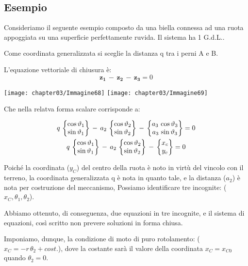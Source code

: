 		\subsection{Esempio}
		
		\begin{minipage}{.6\textwidth}
		Consideriamo il seguente esempio composto da una biella connessa ad una ruota appoggiata su una superficie perfettamente ruvida. Il sistema ha 1 G.d.L..
		
		Come coordinata generalizzata si sceglie la distanza q tra i perni A e B.\newline
		
			L'equazione vettoriale di chiusura è:
		\[\mathbf{z_1}\,-\,\mathbf{z_2}\,-\,\mathbf{z_3}=0\]
		
		\end{minipage}
	\hfill
\begin{minipage}{.4\textwidth}
\centering
		\texttt{[image: chapter03/Immagine68]}
		\texttt{[image: chapter03/Immagine69]}
		\end{minipage}
		
		
	
		
		Che nella relatva forma scalare corrisponde a:
		
		\begin{gather*}
		q\,\begin{Bmatrix}\cos{\vartheta_1}\\\sin{\vartheta_1}\end{Bmatrix}\,-\,a_2\,\begin{Bmatrix}\cos{\vartheta_2}\\\sin{\vartheta_2}\end{Bmatrix}\,-\,\begin{Bmatrix}a_3\,\cos{\vartheta_3}\\a_3\,\sin{\vartheta_3}\end{Bmatrix}=0\\
		q\,\begin{Bmatrix}\cos{\vartheta_1}\\\sin{\vartheta_1}\end{Bmatrix}\,-\,a_2\,\begin{Bmatrix}\cos{\vartheta_2}\\\sin{\vartheta_2}\end{Bmatrix}\,-\,\begin{Bmatrix}x_c\\y_c\end{Bmatrix}=0	
		\end{gather*}
	
		Poiché la coordinata ($y_C$) del centro della ruota è noto in virtù del vincolo con il terreno, la coordinata generalizzata q è nota in quanto tale, e la distanza ($a_2$) è nota per costruzione del meccanismo, Possiamo identificare tre incognite: ($x_C, \theta_1, \theta_2$).
		
		Abbiamo ottenuto, di conseguenza, due equazioni in tre incognite, e il sistema di equazioni, così scritto non prevere soluzioni in forma chiusa.
		
		Imponiamo, dunque, la condizione di moto di puro rotolamento:	($x_C = -r\,\theta_2 + cost.$), dove la costante sarà il valore della coordinata $x_C=x_{C0}$ quando $\theta_2=0$.
		
